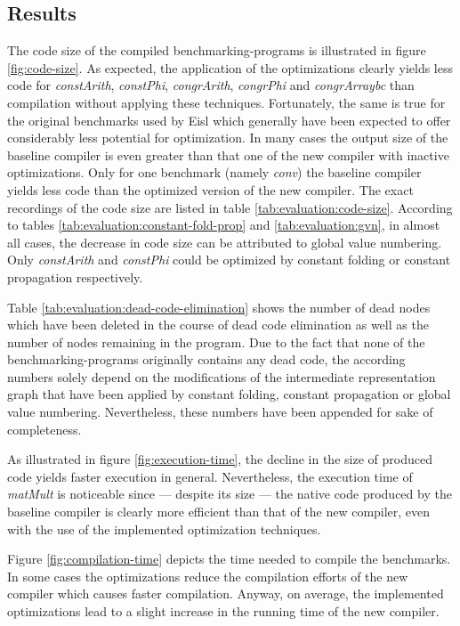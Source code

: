 \subsection{Results}
\label{sec:evaluation:results}

The code size of the compiled benchmarking-programs is illustrated in figure \ref{fig:code-size}. As expected, the application of the optimizations clearly yields less code for \emph{constArith}, \emph{constPhi}, \emph{congrArith}, \emph{congrPhi} and \emph{congrArraybc} than compilation without applying these techniques. Fortunately, the same is true for the original benchmarks used by Eisl which generally have been expected to offer considerably less potential for optimization. In many cases the output size of the baseline compiler is even greater than that one of the new compiler with inactive optimizations. Only for one benchmark (namely \emph{conv}) the baseline compiler yields less code than the optimized version of the new compiler. The exact recordings of the code size are listed in table \ref{tab:evaluation:code-size}. According to tables \ref{tab:evaluation:constant-fold-prop} and \ref{tab:evaluation:gvn}, in almost all cases, the decrease in code size can be attributed to global value numbering. Only \emph{constArith} and \emph{constPhi} could be optimized by constant folding or constant propagation respectively.

Table \ref{tab:evaluation:dead-code-elimination} shows the number of dead nodes which have been deleted in the course of dead code elimination as well as the number of nodes remaining in the program. Due to the fact that none of the benchmarking-programs originally contains any dead code, the according numbers solely depend on the modifications of the intermediate representation graph that have been applied by constant folding, constant propagation or global value numbering. Nevertheless, these numbers have been appended for sake of completeness.

As illustrated in figure \ref{fig:execution-time}, the decline in the size of produced code yields faster execution in general. Nevertheless, the execution time of \emph{matMult} is noticeable since --- despite its size --- the native code produced by the baseline compiler is clearly more efficient than that of the new compiler, even with the use of the implemented optimization techniques.

Figure \ref{fig:compilation-time} depicts the time needed to compile the benchmarks. In some cases the optimizations reduce the compilation efforts of the new compiler which causes faster compilation. Anyway, on average, the implemented optimizations lead to a slight increase in the running time of the new compiler.

